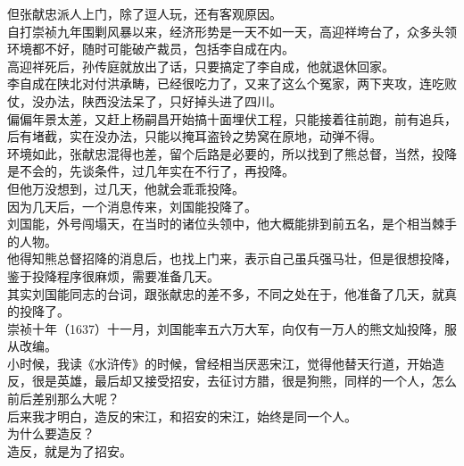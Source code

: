 \begin{multicols}{\theparacolNo}
但张献忠派人上门，除了逗人玩，还有客观原因。\\

自打崇祯九年围剿风暴以来，经济形势是一天不如一天，高迎祥垮台了，众多头领环境都不好，随时可能破产裁员，包括李自成在内。\\

高迎祥死后，孙传庭就放出了话，只要搞定了李自成，他就退休回家。\\

李自成在陕北对付洪承畴，已经很吃力了，又来了这么个冤家，两下夹攻，连吃败仗，没办法，陕西没法呆了，只好掉头进了四川。\\

偏偏年景太差，又赶上杨嗣昌开始搞十面埋伏工程，只能接着往前跑，前有追兵，后有堵截，实在没办法，只能以掩耳盗铃之势窝在原地，动弹不得。\\

环境如此，张献忠混得也差，留个后路是必要的，所以找到了熊总督，当然，投降是不会的，先谈条件，过几年实在不行了，再投降。\\

但他万没想到，过几天，他就会乖乖投降。\\

因为几天后，一个消息传来，刘国能投降了。\\

刘国能，外号闯塌天，在当时的诸位头领中，他大概能排到前五名，是个相当棘手的人物。\\

他得知熊总督招降的消息后，也找上门来，表示自己虽兵强马壮，但是很想投降，鉴于投降程序很麻烦，需要准备几天。\\

其实刘国能同志的台词，跟张献忠的差不多，不同之处在于，他准备了几天，就真的投降了。\\

崇祯十年（1637）十一月，刘国能率五六万大军，向仅有一万人的熊文灿投降，服从改编。\\

小时候，我读《水浒传》的时候，曾经相当厌恶宋江，觉得他替天行道，开始造反，很是英雄，最后却又接受招安，去征讨方腊，很是狗熊，同样的一个人，怎么前后差别那么大呢？\\

后来我才明白，造反的宋江，和招安的宋江，始终是同一个人。\\

为什么要造反？\\

造反，就是为了招安。\\


\end{multicols}
